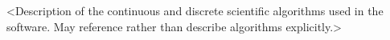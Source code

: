 %


<Description of the continuous and discrete scientific algorithms used
in the software.  May reference rather than describe algorithms explicitly.>



